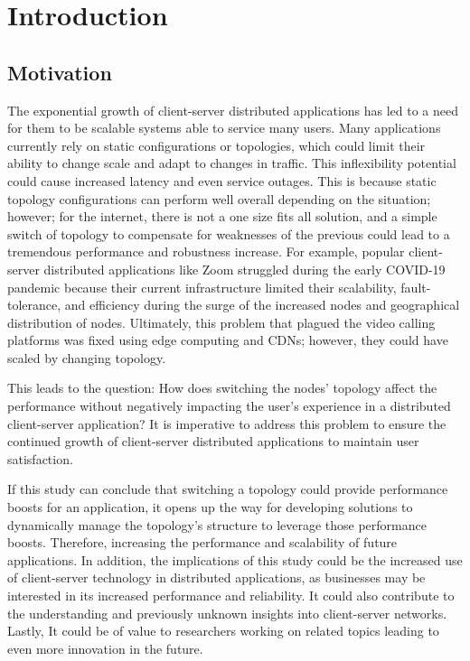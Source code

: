\section{Introduction}

\subsection{Motivation}

\indent The exponential growth of client-server distributed applications has led to a need for them to be scalable systems able to service many users. Many applications currently rely on static configurations or topologies, which could limit their ability to change scale and adapt to changes in traffic. This inflexibility potential could cause increased latency and even service outages. This is because static topology configurations can perform well overall depending on the situation; however; for the internet, there is not a one size fits all solution, and a simple switch of topology to compensate for weaknesses of the previous could lead to a tremendous performance and robustness increase. For example, popular client-server distributed applications like Zoom struggled during the early COVID-19 pandemic because their current infrastructure limited their scalability, fault-tolerance, and efficiency during the surge of the increased nodes and geographical distribution of nodes. Ultimately, this problem that plagued the video calling platforms was fixed using edge computing and CDNs; however, they could have scaled by changing topology.

\indent This leads to the question: How does switching the nodes' topology affect the performance without negatively impacting the user's experience in a distributed client-server application? It is imperative to address this problem to ensure the continued growth of client-server distributed applications to maintain user satisfaction. 

\indent If this study can conclude that switching a topology could provide performance boosts for an application, it opens up the way for developing solutions to dynamically manage the topology's structure to leverage those performance boosts. Therefore, increasing the performance and scalability of future applications. In addition, the implications of this study could be the increased use of client-server technology in distributed applications, as businesses may be interested in its increased performance and reliability. It could also contribute to the understanding and previously unknown insights into client-server networks. Lastly, It could be of value to researchers working on related topics leading to even more innovation in the future.

